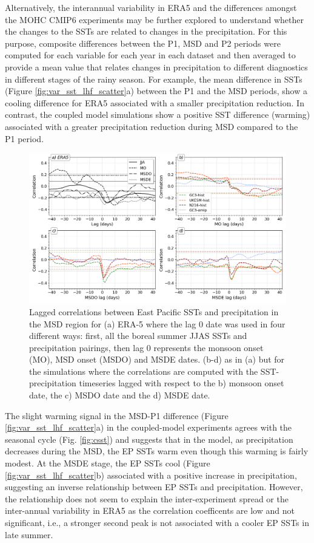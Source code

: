 Alternatively, the interannual variability in ERA5 and the differences amongst the MOHC CMIP6 experiments may be further explored to understand whether the changes to the SSTs are related to changes in the precipitation. For this purpose, composite differences between the P1, MSD and P2 periods were computed for each variable for each year in each dataset and then averaged to provide a mean value that relates changes in precipitation to different diagnostics in different stages of the rainy season.   For example, the mean difference in SSTs (Figure \ref{fig:var_sst_lhf_scatter}a) between the P1 and the MSD periods, show a cooling difference for ERA5 associated with a smaller precipitation reduction. In contrast, the coupled model simulations show a positive SST difference (warming) associated with a greater precipitation reduction during MSD compared to the P1 period.


\begin{figure}[t!]
\includegraphics[width=\linewidth]{figures/sst_regg.png}
\caption[Lagged correlations of East Pacific SSTs]{Lagged correlations between East Pacific SSTs and precipitation in the MSD region for (a) ERA-5 where the lag 0 date was used in four different ways: first, all the boreal summer JJAS SSTs and precipitation pairings, then lag 0 represents the monsoon onset (MO), MSD onset (MSDO) and MSDE dates. (b-d) as in (a) but for the simulations where the correlations are computed with the SST-precipitation timeseries lagged with respect to the b) monsoon onset date, the c) MSDO date and the d) MSDE date.   }
\label{fig:sst_lag}
\end{figure}


The slight warming signal in the MSD-P1 difference (Figure \ref{fig:var_sst_lhf_scatter}a) in the coupled-model experiments agrees with the seasonal cycle (Fig. \ref{fig:csst}) and suggests that in the model, as precipitation decreases during the MSD, the EP SSTs warm even though this warming is fairly modest. At the MSDE stage, the EP SSTs cool (Figure \ref{fig:var_sst_lhf_scatter}b) associated with a positive increase in precipitation, suggesting an inverse relationship between EP SSTs and precipitation. However, the relationship does not seem to explain the inter-experiment spread or the inter-annual variability in ERA5 as the correlation coefficents are low and not significant, i.e., a stronger second peak is not associated with a cooler EP SSTs in late summer. 

